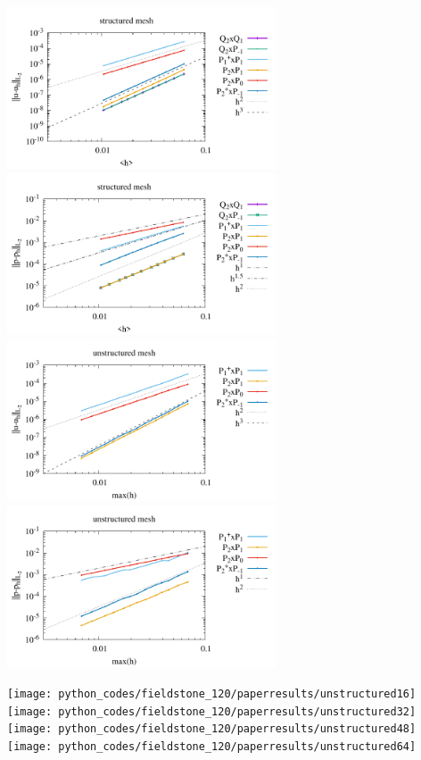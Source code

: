 \begin{center}
\includegraphics[width=8cm]{python_codes/fieldstone_120/paperresults/dh_structured_errorsV.pdf}
\includegraphics[width=8cm]{python_codes/fieldstone_120/paperresults/dh_structured_errorsP.pdf}\\
\includegraphics[width=8cm]{python_codes/fieldstone_120/paperresults/dh_unstructured_errorsV.pdf}
\includegraphics[width=8cm]{python_codes/fieldstone_120/paperresults/dh_unstructured_errorsP.pdf}
\end{center}

\begin{center}
\texttt{[image: python\_codes/fieldstone\_120/paperresults/unstructured16]}
\texttt{[image: python\_codes/fieldstone\_120/paperresults/unstructured32]}\\
\texttt{[image: python\_codes/fieldstone\_120/paperresults/unstructured48]}
\texttt{[image: python\_codes/fieldstone\_120/paperresults/unstructured64]}
\end{center}


